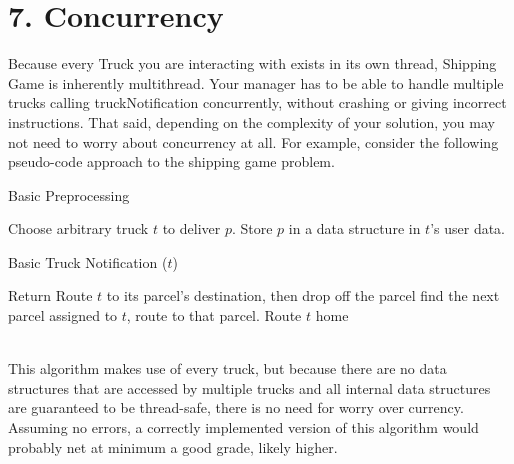 \documentclass[11pt]{article}
\begin{document}
\section{7. Concurrency}
Because every Truck you are interacting with exists in its own thread, Shipping Game is inherently multithread. Your manager has to be able to handle multiple trucks calling truckNotification concurrently, without crashing or giving incorrect instructions. That said, depending on the complexity of your solution, you may not need to worry about concurrency at all. For example, consider the following pseudo-code approach to the shipping game problem.
\begin{algorithm}
\caption{Basic Preprocessing} \label{alg:ls}
\begin{algorithmic}[1]
\STATE Choose arbitrary truck $t$ to deliver $p$. Store $p$ in a data structure in $t$'s user data.
\ENDFOR
\end{algorithmic}
\end{algorithm}
\begin{algorithm}
\caption{Basic Truck Notification ($t$)} \label{alg:ls}
\begin{algorithmic}[1]
\STATE Return
\ENDIF
{}
\STATE Route $t$ to its parcel's destination, then drop off the parcel
\ELSE
\STATE find the next parcel assigned to $t$, route to that parcel.
\ENDIF
\ELSE
\STATE Route $t$ home
\ENDIF
\end{algorithmic}
\end{algorithm}
\\This algorithm makes use of every truck, but because there are no data structures that are accessed by multiple trucks and all internal data structures are guaranteed to be thread-safe, there is no need for worry over currency. Assuming no errors, a correctly implemented version of this algorithm  would probably net at minimum a good grade, likely higher.\\
\end{document}
